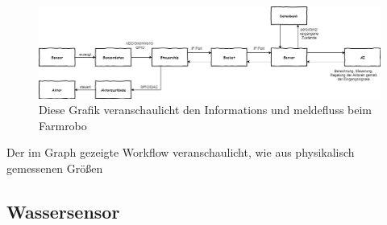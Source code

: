 \documentclass[]{article}
\begin{document}
	\begin{figure}[H]
	\centering
	\includegraphics[width=1\textwidth]{Datenflussdiagramm.png}
	\caption{Diese Grafik veranschaulicht den Informations und meldefluss beim Farmrobo}
	\label{img:grafik-dummy}
	\end{figure}
	
Der im Graph gezeigte Workflow veranschaulicht, wie aus physikalisch gemessenen Größen 



\subsection{Wassersensor}
\end{document}
